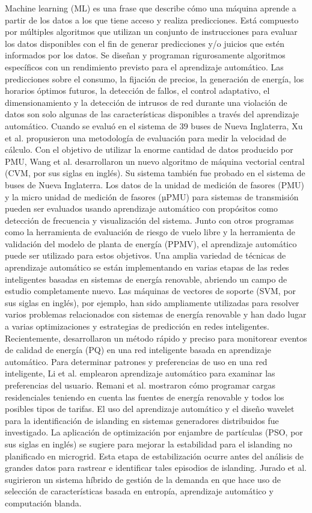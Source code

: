 \documentclass[crop=false]{standalone}
\begin{document}
Machine learning (ML) es una frase que describe cómo una máquina aprende a partir de los datos a los que tiene acceso y realiza predicciones. Está compuesto por múltiples algoritmos que utilizan un conjunto de instrucciones para evaluar los datos disponibles con el fin de generar predicciones y/o juicios que estén informados por los datos. Se diseñan y programan rigurosamente algoritmos específicos con un rendimiento previsto para el aprendizaje automático. Las predicciones sobre el consumo, la fijación de precios, la generación de energía, los horarios óptimos futuros, la detección de fallos, el control adaptativo, el dimensionamiento y la detección de intrusos de red durante una violación de datos son solo algunas de las características disponibles a través del aprendizaje automático.
Cuando se evaluó en el sistema de 39 buses de Nueva Inglaterra, Xu et al. propusieron una metodología de evaluación para medir la velocidad de cálculo. Con el objetivo de utilizar la enorme cantidad de datos producido por PMU, Wang et al. desarrollaron un nuevo algoritmo de máquina vectorial central (CVM, por sus siglas en inglés). Su sistema también fue probado en el sistema de buses de Nueva Inglaterra.
Los datos de la unidad de medición de fasores (PMU) y la micro unidad de medición de fasores (µPMU) para sistemas de transmisión pueden ser evaluados usando aprendizaje automático con propósitos como detección de frecuencia y visualización del sistema. Junto con otros programas como la herramienta de evaluación de riesgo de vuelo libre y la herramienta de validación del modelo de planta de energía (PPMV), el aprendizaje automático puede ser utilizado para estos objetivos. Una amplia variedad de técnicas de aprendizaje automático se están implementando en varias etapas de las redes inteligentes basadas en sistemas de energía renovable, abriendo un campo de estudio completamente nuevo.
Las máquinas de vectores de soporte (SVM, por sus siglas en inglés), por ejemplo, han sido ampliamente utilizadas para resolver varios problemas relacionados con sistemas de energía renovable y han dado lugar a varias optimizaciones y estrategias de predicción en redes inteligentes.
Recientemente, desarrollaron un método rápido y preciso para monitorear eventos de calidad de energía (PQ) en una red inteligente basada en aprendizaje automático. Para determinar patrones y preferencias de uso en una red inteligente, Li et al. emplearon aprendizaje automático para examinar las preferencias del usuario.
Remani et al. mostraron cómo programar cargas residenciales teniendo en cuenta las fuentes de energía renovable y todos los posibles tipos de tarifas. El uso del aprendizaje automático y el diseño wavelet para la identificación de islanding en sistemas generadores distribuidos fue investigado. La aplicación de optimización por enjambre de partículas (PSO, por sus siglas en inglés) se sugiere  para mejorar la estabilidad para el islanding no planificado en microgrid. Esta etapa de estabilización ocurre antes del análisis de grandes datos para rastrear e identificar tales episodios de islanding. Jurado et al. sugirieron un sistema híbrido de gestión de la demanda en que hace uso de selección de características basada en entropía, aprendizaje automático y computación blanda.
\end{document}
